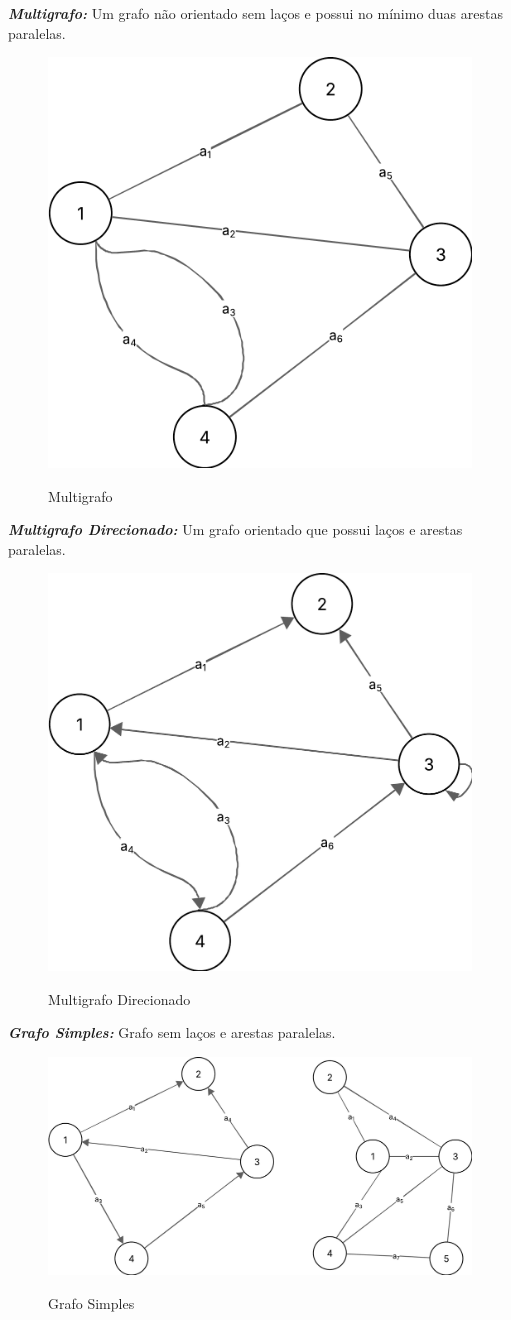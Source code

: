	\textit{\textbf{Multigrafo:}} Um grafo não orientado sem laços e possui no mínimo duas arestas paralelas. \\
	\begin{figure} [H]
		\centering
		\caption{Multigrafo}%
		\label{fig:multigraf}%
		\includegraphics[width=0.5\linewidth,angle=0]{figuras/tiposgrafos/multigrafo.png}%
		\\
	\end{figure}
	\textit{\textbf{Multigrafo Direcionado:}} Um grafo orientado que possui laços e arestas paralelas. \\
	\begin{figure} [H]
		\centering
		\caption{Multigrafo Direcionado}%
		\label{fig:multigrafDirec}%
		\includegraphics[width=0.5\linewidth,angle=0]{figuras/tiposgrafos/multigrafoDirec.png}%
		\\
	\end{figure}
	\textit{\textbf{Grafo Simples:}} Grafo sem laços e arestas paralelas.\\
	\begin{figure} [H]
		\centering
		\caption{Grafo Simples}%
		\label{fig:grafSimples}%
		\includegraphics[width=0.7\linewidth,angle=0]{figuras/tiposgrafos/grafoSimples.png}%
		\\
	\end{figure}

